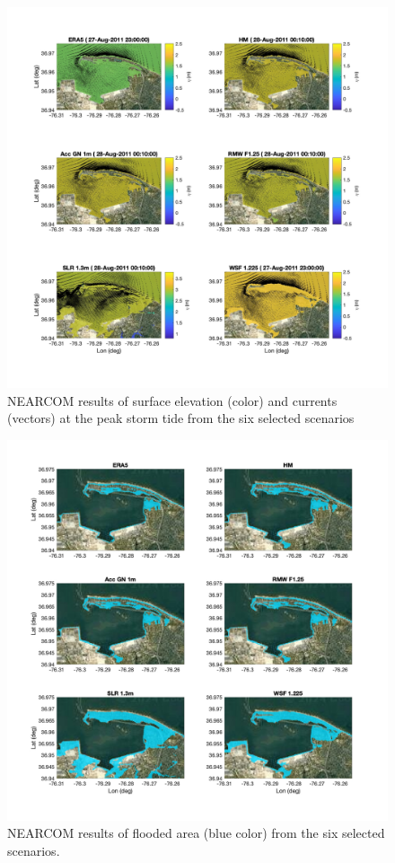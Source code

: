 \documentclass[11pt]{article}
\begin{document}
\begin{figure}[h!]
\centering
\includegraphics[width=\textwidth]{./figures/nearcom_eta_uv.jpg}
\caption{NEARCOM results of surface elevation (color) and currents (vectors) at the peak storm tide from the six selected scenarios}
\label{nearcom_6_cases_eta}
\centering
\end{figure}

\begin{figure}[h!]
\centering
\includegraphics[width=\textwidth]{./figures/nearcom_flood.jpg}
\caption{NEARCOM results of flooded area (blue color) from the six selected scenarios.}
\label{nearcom_6_cases_flood}
\centering
\end{figure}
\end{document}

